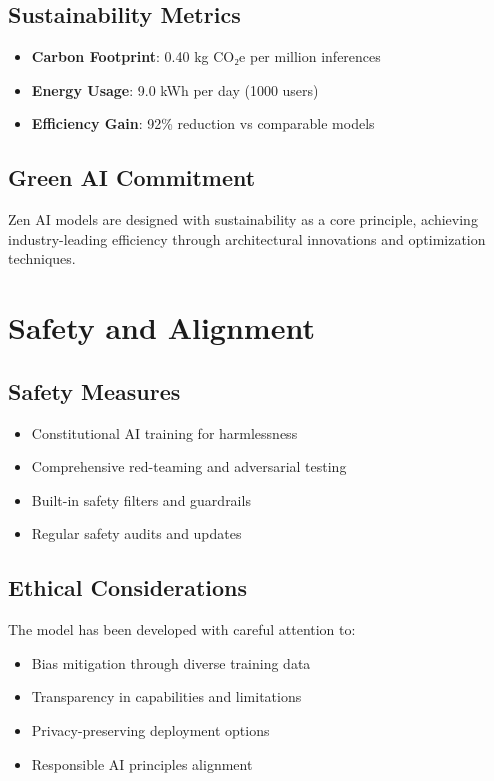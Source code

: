 \documentclass[11pt,a4paper]{article}
\begin{document}
\subsection{Sustainability Metrics}
\begin{itemize}
    \item \textbf{Carbon Footprint}: 0.40 kg CO₂e per million inferences
    \item \textbf{Energy Usage}: 9.0 kWh per day (1000 users)
    \item \textbf{Efficiency Gain}: 92\% reduction vs comparable models
\end{itemize}

\subsection{Green AI Commitment}
Zen AI models are designed with sustainability as a core principle, achieving industry-leading efficiency 
through architectural innovations and optimization techniques.

\section{Safety and Alignment}

\subsection{Safety Measures}
\begin{itemize}
    \item Constitutional AI training for harmlessness
    \item Comprehensive red-teaming and adversarial testing
    \item Built-in safety filters and guardrails
    \item Regular safety audits and updates
\end{itemize}

\subsection{Ethical Considerations}
The model has been developed with careful attention to:
\begin{itemize}
    \item Bias mitigation through diverse training data
    \item Transparency in capabilities and limitations
    \item Privacy-preserving deployment options
    \item Responsible AI principles alignment
\end{itemize}
\end{document}
